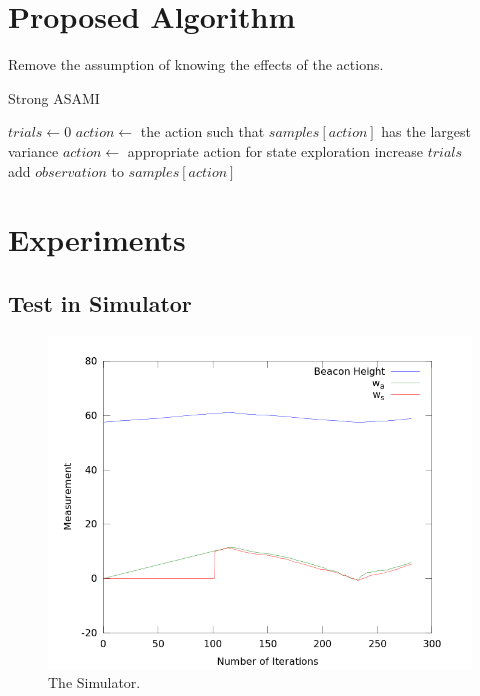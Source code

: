 \documentclass[10pt]{article}
\begin{document}
\section{Proposed Algorithm}

Remove the assumption of knowing the effects of the actions.

\begin{algorithm}
\caption{Strong ASAMI}\label{asami}
\begin{algorithmic}
\State $trials\gets 0$
            \State $action \gets$ the action such that $samples[action]$ has the largest variance
        \Else
            \State $action \gets$ appropriate action for state exploration
        \EndIf
        \State increase $trials$
    \EndWhile
\EndFunction
\\
    \State add $observation$ to $samples[action]$
\EndFunction
\end{algorithmic}
\end{algorithm}

\section{Experiments}

\subsection{Test in Simulator}

\begin{figure}
\centering
\includegraphics[width=0.8\columnwidth]{simResult.png}
\caption{The Simulator.}
\label{fig:fuelworld}
\end{figure}
\end{document}
